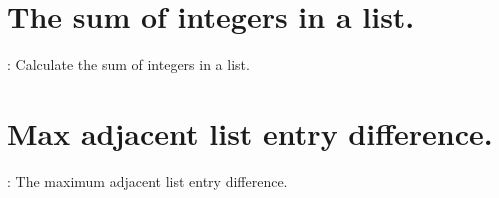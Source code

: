 \documentclass[preview]{standalone}
\begin{document}
    


\section{The sum of integers in a list.}
\color{lightgray} \begin{algorithm}[h]
    \renewcommand{\thealgorithm}{3103}
    \caption{: Calculate the sum of integers in a list.}
    
\end{algorithm} \color{black}
\begin{center}
    
\end{center}
\text{\\}
\begin{center}
    
\end{center}

\pagebreak


\section{Max adjacent list entry difference.}
\color{lightgray} \begin{algorithm}
    \renewcommand{\thealgorithm}{3104}
    \caption{: The maximum adjacent list entry difference.}
    
\end{algorithm} \color{black}
\begin{center}
    
\end{center}
\text{\\}
\begin{center}
    
\end{center}
\pagebreak
\end{document}
